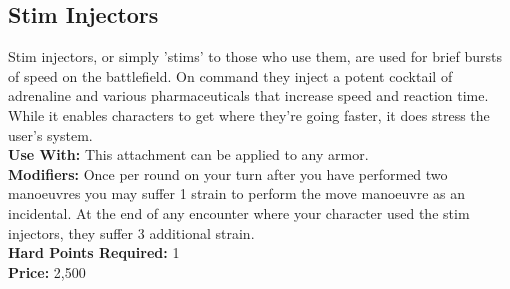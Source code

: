 \subsection{Stim Injectors}
Stim injectors, or simply 'stims' to those who use them, are used for brief bursts of speed on the battlefield. On command they inject a potent cocktail of adrenaline and various pharmaceuticals that increase speed and reaction time. While it enables characters to get where they're going faster, it does stress the user's system.\\
\noindent\textbf{Use With:} This attachment can be applied to any armor.\\
\noindent\textbf{Modifiers:} Once per round on your turn after you have performed two manoeuvres you may suffer 1 strain to perform the move manoeuvre as an incidental. At the end of any encounter where your character used the stim injectors, they suffer 3 additional strain.\\
\noindent\textbf{Hard Points Required:} 1\\
\noindent\textbf{Price:} 2,500